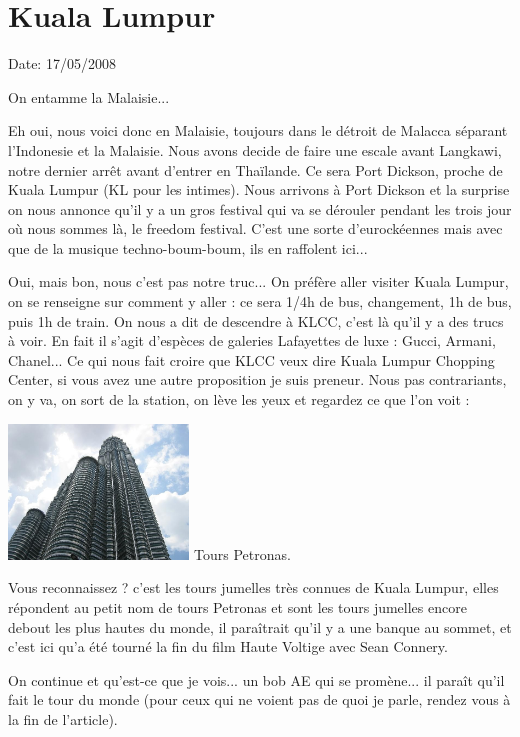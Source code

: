 \section{Kuala Lumpur}

Date: 17/05/2008

\begin{multicols}{2}

On entamme la Malaisie...

Eh oui, nous voici donc en Malaisie, toujours dans le détroit de Malacca séparant l'Indonesie et la Malaisie. Nous avons decide de faire une escale avant Langkawi, notre dernier arrêt avant d'entrer en Thaïlande. Ce sera Port Dickson, proche de Kuala Lumpur (KL pour les intimes). Nous arrivons à Port Dickson et la surprise on nous annonce qu'il y a un gros festival qui va se dérouler pendant les trois jour où nous sommes là, le freedom festival. C'est une sorte d'eurockéennes mais avec que de la musique techno-boum-boum, ils en raffolent ici...

Oui, mais bon, nous c'est pas notre truc... On préfère aller visiter Kuala Lumpur, on se renseigne sur comment y aller : ce sera 1/4h de bus, changement, 1h de bus, puis 1h de train. On nous a dit de descendre à KLCC, c'est là qu'il y a des trucs à voir. En fait il s'agit d'espèces de galeries Lafayettes de luxe : Gucci, Armani, Chanel... Ce qui nous fait croire que KLCC veux dire Kuala Lumpur Chopping Center, si vous avez une autre proposition je suis preneur. Nous pas contrariants, on y va, on sort de la station, on lève les yeux et regardez ce que l'on voit :

\hspace*{-0.65cm}
\includegraphics[width=4.8cm]{articles/Kuala-lumpur/1210432312E0e6.jpg}
Tours Petronas.

Vous reconnaissez ? c'est les tours jumelles très connues de Kuala Lumpur, elles répondent au petit nom de tours Petronas et sont les tours jumelles encore debout les plus hautes du monde, il paraîtrait qu'il y a une banque au sommet, et c'est ici qu'a été tourné la fin du film Haute Voltige avec Sean Connery.

On continue et qu'est-ce que je vois... un bob AE qui se promène... il paraît qu'il fait le tour du monde (pour ceux qui ne voient pas de quoi je parle, rendez vous à la fin de l'article).


\end{multicols}
